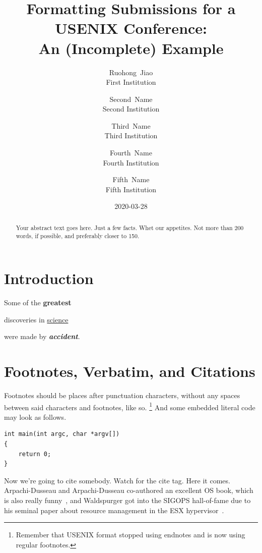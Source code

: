 \documentclass[a4paper,10pt,titlepage]{article}
\title{\Large\bf Formatting Submissions for a USENIX Conference:\\
	An (Incomplete) Example\\
	\hologo{pdfLaTeX}
}
\author{%
    {\rm Ruohong~Jiao}\\
	First Institution
	\and
	{\rm Second~Name}\\
	Second Institution
	\and
	{\rm Third~Name}\\
	Third Institution
	\and
	{\rm Fourth~Name}\\
	Fourth Institution
	\and
	{\rm Fifth~Name}\\
	Fifth Institution
}
\date{2020-03-28}
\begin{document}

\maketitle

\begin{abstract}
Your abstract text goes here. Just a few facts. Whet our appetites.
Not more than 200 words, if possible, and preferably closer to 150.
\end{abstract}


\section{Introduction}
Some of the \textbf{greatest}\par
discoveries in \underline{science}\par
were made by \textbf{\textit{accident}}.\par

\lipsum[1]

\section{Footnotes, Verbatim, and Citations}

Footnotes should be places after punctuation characters, without any
spaces between said characters and footnotes, like so.%
\footnote{Remember that USENIX format stopped using endnotes and is
  now using regular footnotes.} And some embedded literal code may
look as follows.

\begin{verbatim}
int main(int argc, char *argv[]) 
{
    return 0;
}
\end{verbatim}

Now we're going to cite somebody. Watch for the cite tag. Here it
comes. Arpachi-Dusseau and Arpachi-Dusseau co-authored an excellent OS
book, which is also really funny~\cite{arpachiDusseau18:osbook}, and
Waldspurger got into the SIGOPS hall-of-fame due to his seminal paper
about resource management in the ESX hypervisor~\cite{waldspurger02}.
\end{document}
